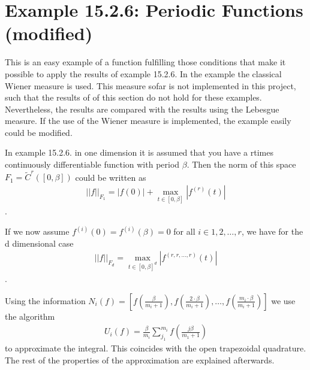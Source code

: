 \documentclass[letterpaper,10pt,english]{sphinxmanual}
\begin{document}
{
\begin{sphinxVerbatim}[commandchars=\\\{\}]
\llap{\color{nbsphinxin}[ ]:\,\hspace{\fboxrule}\hspace{\fboxsep}}
\end{sphinxVerbatim}
}


\chapter{Example 15.2.6: Periodic Functions (modified)}
\label{\detokenize{examples/Periodic_function:Example-15.2.6:-Periodic-Functions-(modified)}}\label{\detokenize{examples/Periodic_function::doc}}
This is an easy example of a function fulfilling those conditions that make it possible to apply the results of example 15.2.6. In the example the classical Wiener measure is used. This measure sofar is not implemented in this project, such that the results of of this section do not hold for these examples. Nevertheless, the results are compared with the results using the Lebesgue measure. If the use of the Wiener measure is implemented, the example easily could be modified.

In example 15.2.6. in one dimension it is assumed that you have a r\sphinxhyphen{}times continuously differentiable function with period \(\beta\). Then the norm of this space \(F_1 = \tilde{C}^{r}([0,\beta])\) could be written as
\begin{equation*}
\begin{split}||f||_{F_1}=|f(0)| + \max_{t\in [0,\beta]}|f^{(r)}(t)|\end{split}
\end{equation*}
.

If we now assume \(f^{(i)}(0)=f^{(i)}(\beta)=0\) for all \(i \in 1, 2, \dots, r\), we have for the d dimensional case
\begin{equation*}
\begin{split}||f||_{F_d}=\max_{t\in [0,\beta]^{d}}|f^{(r,r,\dots,r)}(t)|\end{split}
\end{equation*}
.

Using the information \(N_i (f) = [f(\frac{\beta}{m_i+1}), f(\frac{2\cdot \beta}{m_i+1}), \dots, f(\frac{m_i\cdot \beta}{m_i+1})]\) we use the algorithm
\begin{equation*}
\begin{split}U_i (f) = \frac{\beta}{m_i}\sum^{m_i}_{j_1} f\left(\frac{j\beta}{m_1 +1}\right)\end{split}
\end{equation*}
to approximate the integral. This coincides with the open trapezoidal quadrature. The rest of the properties of the approximation are explained afterwards.
\end{document}
